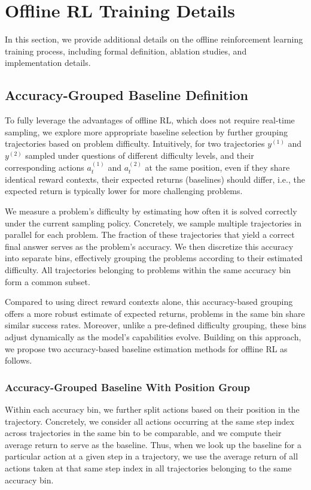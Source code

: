 \section{Offline RL Training Details}

In this section, we provide additional details on the offline reinforcement learning training process, including formal definition, ablation studies, and implementation details.


\subsection{Accuracy-Grouped Baseline Definition}
\label{ap:acc_baseline}
To fully leverage the advantages of offline RL, which does not require real-time sampling, we explore more appropriate baseline selection by further grouping trajectories based on problem difficulty. Intuitively, for two trajectories $y^{(1)}$ and $y^{(2)}$ sampled under questions of different difficulty levels, and their corresponding actions $a^{(1)}_t$ and $a^{(2)}_t$ at the same position, even if they share identical reward contexts, their expected returns (baselines) should differ, i.e., the expected return is typically lower for more challenging problems. 

We measure a problem’s difficulty by estimating how often it is solved correctly under the current sampling policy. Concretely, we sample multiple trajectories in parallel for each problem. The fraction of these trajectories that yield a correct final answer serves as the problem’s accuracy. We then discretize this accuracy into separate bins, effectively grouping the problems according to their estimated difficulty. All trajectories belonging to problems within the same accuracy bin form a common subset.

Compared to using direct reward contexts alone, this accuracy-based grouping offers a more robust estimate of expected returns, problems in the same bin share similar success rates. Moreover, unlike a pre-defined difficulty grouping, these bins adjust dynamically as the model’s capabilities evolve. Building on this approach, we propose two accuracy-based baseline estimation methods for offline RL as follows.

\subsubsection{Accuracy-Grouped Baseline With Position Group}
\label{ap:acc_baseline_position}
Within each accuracy bin, we further split actions based on their position in the trajectory. Concretely, we consider all actions occurring at the same step index across trajectories in the same bin to be comparable, and we compute their average return to serve as the baseline. Thus, when we look up the baseline for a particular action at a given step in a trajectory, we use the average return of all actions taken at that same step index in all trajectories belonging to the same accuracy bin.

